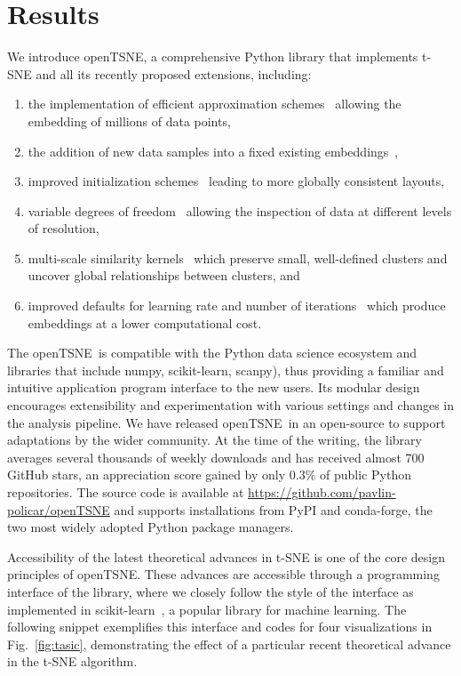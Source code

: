 \documentclass[twocolumn]{bmcart}
\newcommand{\opentsne}{\textsf{openTSNE}}
\begin{document}
\section*{Results}

We introduce \opentsne, a comprehensive Python library that implements t-SNE
and all its recently proposed extensions, including:
\begin{enumerate}
\item the implementation of efficient approximation 
	schemes~\cite{van2014accelerating,linderman2019fast} allowing the embedding
	of millions of data points,
\item the addition of new data samples into a fixed existing
	embeddings~\cite{policar2019embedding},
\item improved initialization schemes~\cite{kobak2019umap} leading to more
	globally consistent layouts,
\item variable degrees of freedom~\cite{kobak2019heavy} allowing the inspection
	of data at different levels of resolution,
\item multi-scale similarity kernels~\cite{kobak2019art} which preserve small,
	well-defined clusters and uncover global relationships between clusters,
	and
\item improved defaults for learning rate and number of
	iterations~\cite{belkina2019automated} which produce embeddings at a lower
	computational cost.
\end{enumerate}

The \opentsne\ is compatible with the Python data science ecosystem and libraries that include
\textsf{numpy}, \textsf{scikit-learn}, \textsf{scanpy}), thus providing a familiar and intuitive application program interface to the new users. Its modular design encourages extensibility and experimentation with various settings and changes in the analysis pipeline.
We have released \opentsne\ in an open-source to support adaptations by the wider community. At the time of the writing, the library averages several thousands of weekly downloads and has received almost 700 GitHub stars, an appreciation score gained by only $0.3\%$ of public Python repositories. The source code is available at
\url{https://github.com/pavlin-policar/openTSNE} and supports installations from
\textsf{PyPI} and \textsf{conda-forge}, the two most widely adopted Python
package managers.

Accessibility of the latest theoretical advances in t-SNE is one of the core design principles of \opentsne. These advances are accessible through a programming interface of the library, where we closely follow the style of the interface as implemented in
\textsf{scikit-learn}~\cite{sklearn_api}, a popular library for machine learning. The following snippet exemplifies this interface and codes for four visualizations in Fig.~\ref{fig:tasic}, demonstrating the effect of a particular recent theoretical advance in the t-SNE algorithm. 
\end{document}
